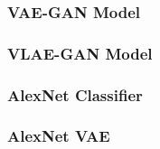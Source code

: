 \subsubsection{VAE-GAN Model}

\subsubsection{VLAE-GAN Model}

\subsubsection{AlexNet Classifier}

\subsubsection{AlexNet VAE}




